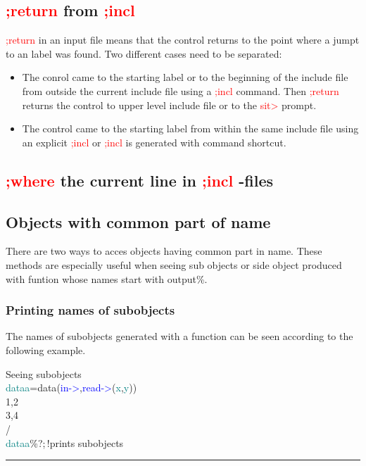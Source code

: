 \subsection{\textcolor{Red}{;return} from \textcolor{Red}{;incl}} 
\label{inpureturn} 
\textcolor{Red}{;return} in an input file means that the control returns to the point where a 
jumpt to an label was found. Two different cases need to be separated: 
\begin{itemize} 
\item The conrol came to the starting label or to the beginning of the include file 
from outside the current include file using a \textcolor{Red}{;incl} command. Then \textcolor{Red}{;return} returns the control to upper level include 
file or to the \textcolor{Red}{sit>} prompt. 
\item The control came to the starting label from within the same include file using 
an explicit \textcolor{Red}{;incl} or \textcolor{Red}{;incl} is generated 
with command shortcut. 
\end{itemize} 
\subsection{\textcolor{Red}{;where} the current line in \textcolor{Red}{;incl} -files} 
\label{inpuwhere} 
\subsection{Objects with common part of name} 
\label{inpusubobj} 
There are two ways to acces objects having common part in name. These methods are especially useful 
when seeing sub objects or side object produced with funtion whose names start with output\%. 
\subsubsection{Printing names of subobjects} 
\label{inpusub1} 
The names of subobjects generated with a function can be seen according 
to the following example. 
\singlespacing 
\begin{example}[subobjex]Seeing subobjects\\ 
\label{subobjex} 
\noindent \textcolor{teal}{dataa}=\textcolor{VioletRed}{data}(\textcolor{blue}{in->},\textcolor{blue}{read->}(\textcolor{teal}{x},\textcolor{teal}{y}))\\ 
1,2\\ 
3,4\\ 
/  \\ 
\textcolor{teal}{dataa}\%?;\,{\color{ForestGreen}!prints subobjects}\\ 
\end{example} 
\vspace{-7mm} \rule{5cm}{0.1pt} 
\onehalfspacing 
